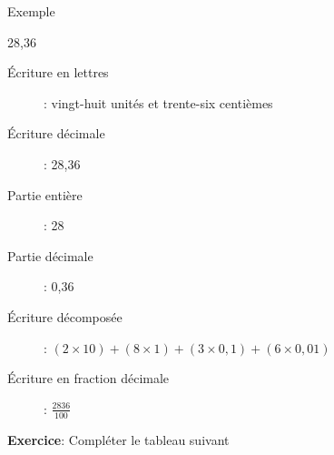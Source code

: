 \documentclass[12pt,a4paper]{article}
\begin{document}
\begin{definition}{Exemple}
\begin{center}
28,36
\end{center}
\begin{description}
\item[Écriture en lettres]: vingt-huit unités et trente-six centièmes
\item[Écriture décimale]: 28,36
\item[Partie entière]: 28
\item[Partie décimale]: 0,36
\item[Écriture décomposée]: $ (2\times 10) + (8\times 1) + (3\times 0,1) + (6\times 0,01) $
\item[Écriture en fraction décimale]: $\displaystyle\frac{2836}{100}$
\end{description}
\end{definition}

\textbf{Exercice}: Compléter le tableau suivant
\end{document}
